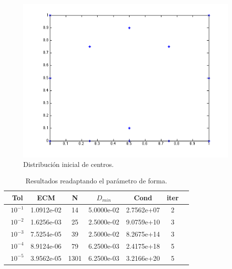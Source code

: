 \documentclass[11pt,a4paper]{article}
\begin{document}
\begin{figure}[H]
\begin{center}
\includegraphics[scale=.5]{inicial1.png}
\caption{Distribución inicial de centros.}
\end{center}
\end{figure}


\begin{table}[H]
\caption{Resultados readaptando el parámetro de forma.}
\begin{center}
\begin{tabular}{|c|c|c|c|c|c|c|}
\hline
\ Tol & ECM & N & $D_{min}$ & Cond  & iter \\
\hline
\ $10^{-1}$ & 1.0912e-02 & 14 & 5.0000e-02 & 2.7562e+07 &  2\\
\ $10^{-2}$ & 1.6256e-03 &25 & 2.5000e-02& 9.0759e+10 & 3 \\
\ $10^{-3}$& 7.5254e-05& 39 & 2.5000e-02 &  8.2675e+14 &  3 \\
\ $10^{-4}$& 8.9124e-06& 79 & 6.2500e-03 &  2.4175e+18 &  5 \\
\ $10^{-5}$& 3.9562e-05& 1301 & 6.2500e-03 & 3.2166e+20 &  5 \\
\hline
\end{tabular}
\end{center}
\end{table}
\end{document}
